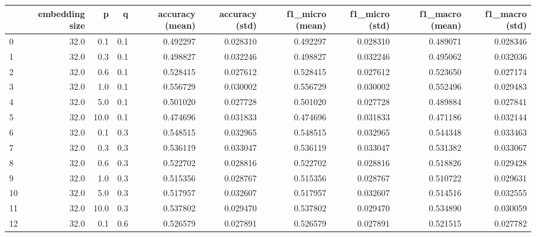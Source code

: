 \begin{tabular}{lrrrrrrrrr}
\toprule
{} &  embedding size &     p &     q &  accuracy (mean) &  accuracy (std) &  f1\_micro (mean) &  f1\_micro (std) &  f1\_macro (mean) &  f1\_macro (std) \\
\midrule
0  &            32.0 &   0.1 &   0.1 &         0.492297 &        0.028310 &         0.492297 &        0.028310 &         0.489071 &        0.028346 \\
1  &            32.0 &   0.3 &   0.1 &         0.498827 &        0.032246 &         0.498827 &        0.032246 &         0.495062 &        0.032036 \\
2  &            32.0 &   0.6 &   0.1 &         0.528415 &        0.027612 &         0.528415 &        0.027612 &         0.523650 &        0.027174 \\
3  &            32.0 &   1.0 &   0.1 &         0.556729 &        0.030002 &         0.556729 &        0.030002 &         0.552496 &        0.029483 \\
4  &            32.0 &   5.0 &   0.1 &         0.501020 &        0.027728 &         0.501020 &        0.027728 &         0.489884 &        0.027841 \\
5  &            32.0 &  10.0 &   0.1 &         0.474696 &        0.031833 &         0.474696 &        0.031833 &         0.471186 &        0.032144 \\
6  &            32.0 &   0.1 &   0.3 &         0.548515 &        0.032965 &         0.548515 &        0.032965 &         0.544348 &        0.033463 \\
7  &            32.0 &   0.3 &   0.3 &         0.536119 &        0.033047 &         0.536119 &        0.033047 &         0.531382 &        0.033067 \\
8  &            32.0 &   0.6 &   0.3 &         0.522702 &        0.028816 &         0.522702 &        0.028816 &         0.518826 &        0.029428 \\
9  &            32.0 &   1.0 &   0.3 &         0.515356 &        0.028767 &         0.515356 &        0.028767 &         0.510722 &        0.029631 \\
10 &            32.0 &   5.0 &   0.3 &         0.517957 &        0.032607 &         0.517957 &        0.032607 &         0.514516 &        0.032555 \\
11 &            32.0 &  10.0 &   0.3 &         0.537802 &        0.029470 &         0.537802 &        0.029470 &         0.534890 &        0.030059 \\
12 &            32.0 &   0.1 &   0.6 &         0.526579 &        0.027891 &         0.526579 &        0.027891 &         0.521515 &        0.027782 \\

\end{tabular}
